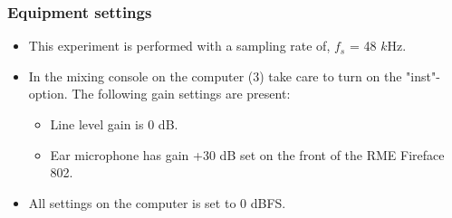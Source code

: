 \subsubsection{Equipment settings}
\begin{itemize}
	\item This experiment is performed with a sampling rate of, $f_{s}$ = 48 $k$Hz. 
	\item In the mixing console on the computer (3) take care to turn on the "inst"-option. The following gain settings are present: 		
	\begin{itemize}
		\item Line level gain is 0 dB.
		\item Ear microphone has gain +30 dB set on the front of the RME Fireface 802.
	\end{itemize}
	\item All settings on the computer is set to 0 dBFS.
\end{itemize}
	
	

